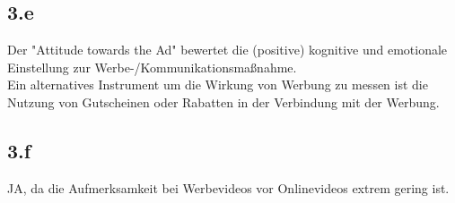 \subsection{3.e}
    Der "Attitude towards the Ad" bewertet die (positive) kognitive und emotionale Einstellung zur Werbe-/Kommunikationsmaßnahme. \\
    Ein alternatives Instrument um die Wirkung von Werbung zu messen ist die Nutzung von Gutscheinen oder Rabatten in der Verbindung mit der Werbung.

\subsection{3.f}
    JA, da die Aufmerksamkeit bei Werbevideos vor Onlinevideos extrem gering ist.